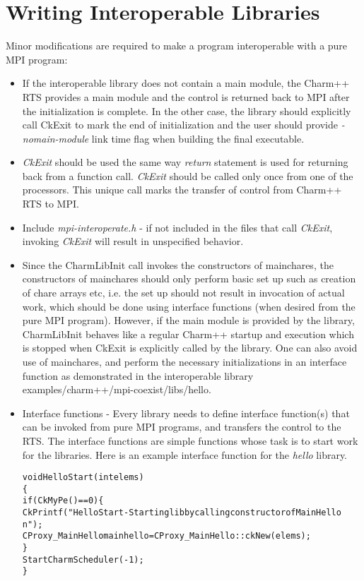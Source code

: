 \section{Writing Interoperable \charmpp{} Libraries}
Minor modifications are required to make a \charmpp{} program interoperable with a pure
MPI program:
\begin{itemize}
\item If the interoperable \charmpp{} library does not contain a main
module, the Charm++ RTS provides a main module and the control is returned back to MPI after the
initialization is complete. In the other case, the library should explicitly call CkExit to mark the end of
initialization  and the user should provide {\em -nomain-module} link time flag when
building the final executable.

\item {\em CkExit} should be used the same way {\em return} statement is used for returning
back from a function call. {\em CkExit} should be called only once from one
of the processors. This unique call marks the transfer of control from Charm++ RTS to
MPI.
\item Include {\em mpi-interoperate.h} - if not included in the files that call
{\em CkExit}, invoking {\em CkExit} will result
in unspecified behavior.
\item Since the CharmLibInit call invokes the constructors of mainchares, the
constructors of mainchares should only perform basic set up such as creation of chare
arrays etc, i.e. the set up should not result in invocation of actual work, which
should be done using interface functions (when desired from the pure MPI
program). However, if the main module is provided by the library, CharmLibInit
behaves like a regular Charm++ startup and execution which is stopped when CkExit is
explicitly called by the library.
One can also avoid use of mainchares, and perform the necessary
initializations in an interface function as demonstrated in the interoperable
library examples/charm++/mpi-coexist/libs/hello.
\item Interface functions - Every library needs to define interface function(s)
that can be invoked from pure MPI programs, and transfers the control to the
\charmpp{} RTS. The interface functions are simple functions whose task is to
start work for the \charmpp{} libraries. Here is an example interface function for the
{\em hello} library.
\begin{alltt}
void HelloStart(int elems)
\{
  if(CkMyPe() == 0) \{
    CkPrintf("HelloStart - Starting lib by calling constructor of MainHello\\n");
    CProxy\_MainHello mainhello = CProxy\_MainHello::ckNew(elems);
  \}
  StartCharmScheduler(-1);
\}
\end{alltt}


\end{itemize}
